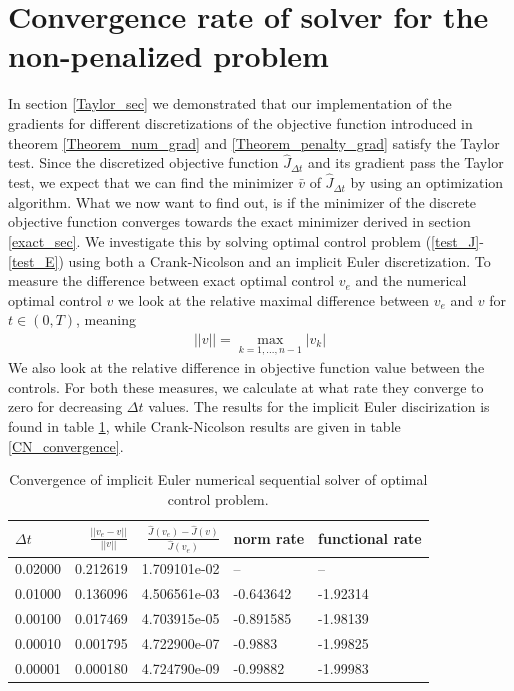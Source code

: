 \section{Convergence rate of solver for the non-penalized problem}
In section \ref{Taylor_sec} we demonstrated that our implementation of the gradients for different discretizations of the objective function introduced in theorem \ref{Theorem_num_grad} and \ref{Theorem_penalty_grad} satisfy the Taylor test. Since the discretized objective function $\hat J_{\Delta t}$ and its gradient pass the Taylor test, we expect that we can find the minimizer $\bar v$ of $\hat J_{\Delta t}$ by using an optimization algorithm. What we now want to find out, is if the minimizer of the discrete objective function converges towards the exact minimizer derived in section \ref{exact_sec}. We investigate this by solving optimal control problem (\ref{test_J}-\ref{test_E}) using both a Crank-Nicolson and an implicit Euler discretization. To measure the difference between exact optimal control $v_e$ and the numerical optimal control $v$ we look at the relative maximal difference between $v_e$ and $v$ for $t\in(0,T)$, meaning
\begin{align}
||v|| = \max_{k=1,...,n-1}|v_k| \label{inner_norm}
\end{align} 
We also look at the relative difference in objective function value between the controls. For both these measures, we calculate at what rate they converge to zero for decreasing $\Delta t$ values. The results for the implicit Euler discirization is found in table \ref{IE_convergence}, while Crank-Nicolson results are given in table \ref{CN_convergence}.
\begin{table}[!h]
\caption{Convergence of implicit Euler numerical sequential solver of optimal control problem.}\label{IE_convergence}
\centering
\begin{tabular}{lrrll}
\toprule
{} $\Delta t$&    $\frac{||v_e-v||}{||v||}$ &  $\frac{\hat J(v_e)-\hat J(v)}{\hat J(v_e)}$ &   norm rate &    functional rate \\
\midrule
0.02000 &  0.212619 &  1.709101e-02 &        -- &       -- \\
0.01000 &  0.136096 &  4.506561e-03 & -0.643642 & -1.92314 \\
0.00100 &  0.017469 &  4.703915e-05 & -0.891585 & -1.98139 \\
0.00010 &  0.001795 &  4.722900e-07 &   -0.9883 & -1.99825 \\
0.00001 &  0.000180 &  4.724790e-09 &  -0.99882 & -1.99983 \\
\bottomrule
\end{tabular}
\end{table}

